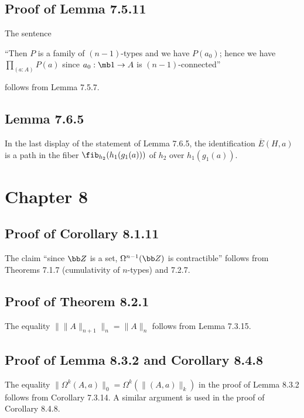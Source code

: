 \documentclass[12pt]{article}
\begin{document}

\subsection{Proof of Lemma 7.5.11}

The sentence 

\nn``Then $P$ is a family of $(n-1)$-types and we have $P(a_0)$; hence we have $\prod_{(a:A)}P(a)$ since $a_0:\mb1\to A$ is $(n-1)$-connected''

\nn follows from Lemma 7.5.7.


\subsection{Lemma 7.6.5}

In the last display of the statement of Lemma 7.6.5, the identification $\overline{E}(H,a)$ is a path in the fiber $\fib_{h_2}(h_1(g_1(a)))$ of $h_2$ over $h_1(g_1(a))$.


\section{Chapter 8}

\subsection{Proof of Corollary 8.1.11}

The claim ``since $\bb Z$ is a set, $\Omega^{n-1}(\bb Z)$ is contractible'' follows from Theorems 7.1.7 (cumulativity of $n$-types) and 7.2.7.


\subsection{Proof of Theorem 8.2.1}

The equality $\lVert\lVert A\rVert_{n+1}\rVert_n=\lVert A\rVert_n$ follows from Lemma 7.3.15.


\subsection{Proof of Lemma 8.3.2 and Corollary 8.4.8}

The equality $\lVert\Omega^k(A,a)\rVert_0=\Omega^k(\lVert(A,a)\rVert_k)$ in the proof of Lemma 8.3.2 follows from Corollary 7.3.14. A similar argument is used in the proof of Corollary 8.4.8.
\end{document}
